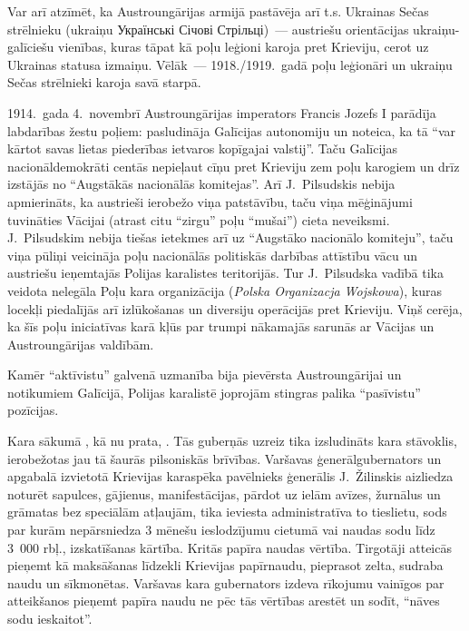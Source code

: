 \documentclass[twoside,a5paper,12pt,fleqn,openany]{extbook}
\newcommand{\pltxti}[1]{\textit{\textpolish{#1}}}
\newcommand{\uktxti}[1]{\textukrainian{#1}}
\begin{document}
Var arī atzīmēt, ka Austroungārijas armijā pastāvēja arī t.s. Ukrainas Sečas strēlnieku (ukraiņu \uktxti{Українські Січові Стрільці})~--- austriešu orientācijas ukraiņu-galīciešu vienības, kuras tāpat kā poļu leģioni karoja pret Krieviju, cerot uz Ukrainas statusa izmaiņu. Vēlāk~--- 1918./1919.~gadā poļu leģionāri un ukraiņu Sečas strēlnieki karoja savā starpā.

1914.~gada 4.~novembrī Austroungārijas imperators Francis Jozefs I parādīja labdarības žestu poļiem: pasludināja Galīcijas autonomiju un noteica, ka tā ``var kārtot savas lietas piederības ietvaros kopīgajai valstij''. Taču Galīcijas nacionāldemokrāti centās nepieļaut cīņu pret Krieviju zem poļu karogiem un drīz izstājās no ``Augstākās nacionālās komitejas''. Arī J.~Pilsudskis nebija apmierināts, ka austrieši ierobežo viņa patstāvību, taču viņa mēģinājumi tuvināties Vācijai (atrast citu ``zirgu'' poļu ``mušai'') cieta neveiksmi. J.~Pilsudskim nebija tiešas ietekmes arī uz ``Augstāko nacionālo komiteju'', taču viņa pūliņi veicināja poļu nacionālās politiskās darbības attīstību vācu un austriešu ieņemtajās Polijas karalistes teritorijās. Tur J.~Pilsudska vadībā tika veidota nelegāla Poļu kara organizācija (\pltxti{Polska Organizacja Wojskowa}), kuras locekļi piedalījās arī izlūkošanas un diversiju operācijās pret Krieviju. Viņš cerēja, ka šīs poļu iniciatīvas karā kļūs par trumpi nākamajās sarunās ar Vācijas un Austroungārijas valdībām.

Kamēr ``aktīvistu'' galvenā uzmanība bija pievērsta Austroungārijai un notikumiem Galīcijā, Polijas karalistē joprojām stingras palika ``pasīvistu'' pozīcijas.

Kara sākumā , kā nu prata, . Tās guberņās uzreiz tika izsludināts kara stāvoklis, ierobežotas jau tā šaurās pilsoniskās brīvības. Varšavas ģenerālgubernators un apgabalā izvietotā Krievijas karaspēka pavēlnieks ģenerālis J.~Žilinskis aizliedza noturēt sapulces, gājienus, manifestācijas, pārdot uz ielām avīzes, žurnālus un grāmatas bez speciālām atļaujām, tika ieviesta administratīva to tieslietu, sods par kurām nepārsniedza 3 mēnešu ieslodzījumu cietumā vai naudas sodu līdz 3~000 rbļ., izskatīšanas kārtība. Kritās papīra naudas vērtība. Tirgotāji atteicās pieņemt kā maksāšanas līdzekli Krievijas papīrnaudu, pieprasot zelta, sudraba naudu un sīkmonētas. Varšavas kara gubernators izdeva rīkojumu vainīgos par atteikšanos pieņemt papīra naudu ne pēc tās vērtības arestēt un sodīt, ``nāves sodu ieskaitot''.
\end{document}
